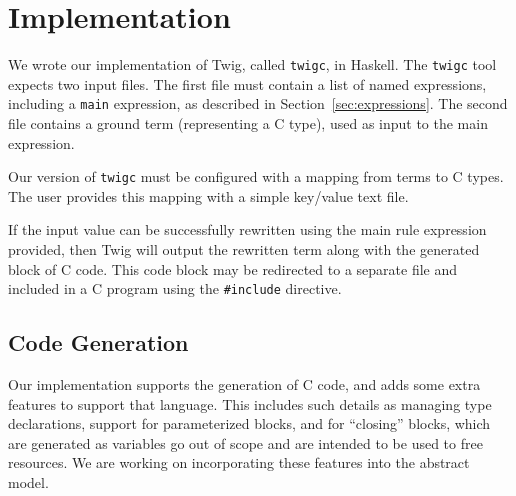 
\section{Implementation}

We wrote our implementation of Twig, called \texttt{twigc}, in
Haskell. The \texttt{twigc} tool expects two input files. The
first file must contain a list of named expressions, including a
\texttt{main} expression, as described in
Section~\ref{sec:expressions}. The second file contains a ground
term (representing a C type), used as input to the main
expression.

Our version of \texttt{twigc} must be configured with a mapping
from terms to C types. The user provides this mapping with a
simple key/value text file.

If the input value can be successfully rewritten using the main
rule expression provided, then Twig will output the rewritten term
along with the generated block of C code. This code block may be
redirected to a separate file and included in a C program using
the \texttt{\#include} directive.

\subsection{Code Generation}

Our implementation supports the generation of C code, and adds
some extra features to support that language. This includes such
details as managing type declarations, support for parameterized
blocks, and for ``closing'' blocks, which are generated as
variables go out of scope and are intended to be used to free
resources. We are working on incorporating these features into the
abstract model.
